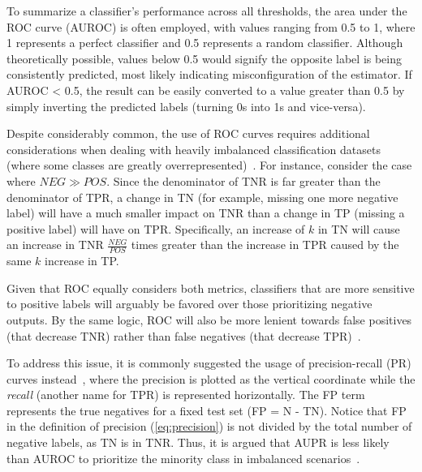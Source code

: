 

To summarize a classifier's performance across all thresholds, the area under the ROC curve (AUROC) is often employed, with values ranging from 0.5 to 1, where 1 represents a perfect classifier and 0.5 represents a random classifier. Although theoretically possible, values below 0.5 would signify the opposite label is being consistently predicted, most likely indicating misconfiguration of the estimator. If AUROC < 0.5, the result can be easily converted to a value greater than 0.5 by simply inverting the predicted labels (turning 0s into 1s and vice-versa).

Despite considerably common, the use of ROC curves requires additional considerations when dealing with heavily imbalanced classification datasets (where some classes are greatly overrepresented)~\cite{he2009learning,saito2015precisionrecall,fernandez2018learning}.
For instance,%
consider the case where $NEG \gg POS$. Since the denominator of TNR is far greater than the denominator of TPR, a change in TN (for example, missing one more negative label) will have a much smaller impact on TNR than a change in TP (missing a positive label) will have on TPR.
Specifically, an increase of $k$ in TN will cause an increase in TNR $\frac{NEG}{POS}$ times greater than the increase in TPR caused by the same $k$ increase in TP.


Given that ROC equally considers both metrics, classifiers that are more sensitive to positive labels will arguably be favored over those prioritizing negative outputs. By the same logic, ROC will also be more lenient towards false positives (that decrease TNR) rather than false negatives (that decrease TPR)~\cite{ozenne2015precision}.

To address this issue, it is commonly suggested the usage of precision-recall (PR) curves instead~\cite{ozenne2015precision,he2009learning,pahikkala2015more,hao2019opensource,ezzat2019computational,yu2020fpscdtia}, where the precision is plotted as the vertical coordinate while the \emph{recall} (another name for TPR) is represented horizontally.
%
The FP term represents the true negatives for a fixed test set (FP = N - TN). Notice that FP in the definition of precision (\autoref{eq:precision}) is not divided by the total number of negative labels, as TN is in TNR. Thus, it is argued that AUPR is less likely than AUROC to prioritize the minority class in imbalanced scenarios~\cite{ozenne2015precision,he2009learning}.

